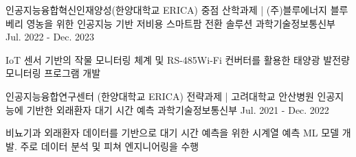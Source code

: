 \begin{cventries}
\cventry
  {인공지능융합혁신인재양성(한양대학교 ERICA) 중점 산학과제 | \faBuilding[regular] (주)블루에너지} %
  {블루베리 영농을 위한 인공지능 기반 저비용 스마트팜 전환 솔루션} %
  {\faFlask\space 과학기술정보통신부} %
  {Jul. 2022 - Dec. 2023} %
  {
    \begin{cvitems} %
      \item {IoT 센서 기반의 작물 모니터링 체계 및 RS-485{\enskip\cdotp\enskip}Wi-Fi 컨버터를 활용한 태양광 발전량 모니터링 프로그램 개발}
    \end{cvitems}
  }


\cventry
  {인공지능융합연구센터 (한양대학교 ERICA) 전략과제 | \faHospital[regular] 고려대학교 안산병원} %
  {인공지능에 기반한 외래환자 대기 시간 예측} %
  {\faFlask\space 과학기술정보통신부} %
  {Jul. 2021 - Dec. 2022} %
  {
    \begin{cvitems} %
      \item {비뇨기과 외래환자 데이터를 기반으로 대기 시간 예측을 위한 시계열 예측 ML 모델 개발. 주로 데이터 분석 및 피쳐 엔지니어링을 수행}
    \end{cvitems}
  }

\end{cventries}
